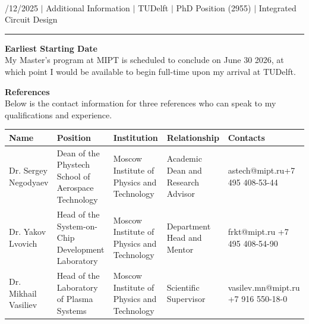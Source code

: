 \documentclass[a4paper,12pt]{article}
\begin{document}
\begin{center}
  {\Huge \scshape {\fontsize{25}{30}\selectfont{Reza}} {\fontsize{25}{30}}} \\ 
  {\fontsize{12}{12}/12/2025} $|$
  {\fontsize{12}{12}\selectfont Additional Information} $|$
  {\fontsize{12}{12}\selectfont TUDelft} $|$
  {\fontsize{12}{12}\selectfont PhD Position (2955)} $|$
  {\fontsize{12}{12}\selectfont Integrated Circuit Design}
\end{center}

\vspace{-20pt}
\noindent\rule{\textwidth}{0.5pt}

\textbf{Earliest Starting Date}\\
My Master's program at MIPT is scheduled to conclude on June 30 2026, at which point I would be available to begin full-time upon my arrival at TUDelft.

\vspace{20pt}

\textbf{References}\\
Below is the contact information for three references who can speak to my qualifications and experience.

\vspace{10pt}

\small
\centering
{\renewcommand{\arraystretch}{2}%
\begin{tabularx}{\textwidth}{@{}YYYYY@{}}
\toprule
\addlinespace[-10pt]
\textbf{Name} & \textbf{Position} & \textbf{Institution} & \textbf{Relationship} & \textbf{Contacts} \\
\midrule
Dr. Sergey Negodyaev & Dean of the Phystech School of Aerospace Technology & Moscow Institute of Physics and Technology & Academic Dean and Research Advisor & astech@mipt.ru\newline +7 495 408-53-44 \\

Dr. Yakov Lvovich &  Head of the System-on-Chip Development Laboratory & Moscow Institute of Physics and Technology & Department Head and Mentor & frkt@mipt.ru \newline +7 495 408-54-90 \\

Dr. Mikhail Vasiliev & Head of the Laboratory of Plasma Systems & Moscow Institute of Physics and Technology & Scientific Supervisor & vasilev.mn@mipt.ru \newline +7 916 550-18-0 \\
\bottomrule
\end{tabularx}}
\end{document}
